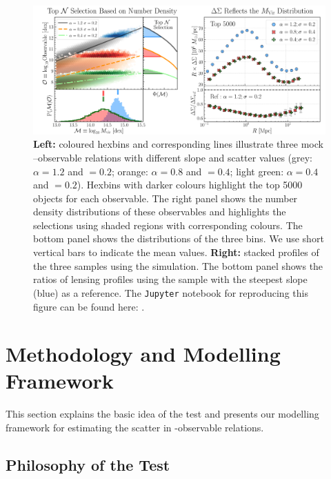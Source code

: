 \documentclass[fleqn,usenatbib,useAMS]{mnras}
\begin{document}
\begin{CJK*}{UTF8}{gbsn}
\begin{figure}
\includegraphics[width=\textwidth]{figure/fig_1}
\caption{
    \textbf{Left:} coloured hexbins and corresponding lines illustrate
        three mock \mvir{}--observable relations with different slope and scatter values
        (grey: $\alpha=1.2$ and \scatterObsSymMhalo{}$=0.2$; 
        orange: $\alpha=0.8$ and \scatterObsSymMhalo{}$=0.4$;
        light green: $\alpha=0.4$ and \scatterObsSymMhalo{}$=0.2$).
        Hexbins with darker colours highlight the top 5000 objects for each observable.
        The right panel shows the number density distributions of these observables
        and highlights the \topn{} selections using shaded regions with corresponding 
        colours.
        The bottom panel shows the \mvir{} distributions of the three \topn{} bins.
        We use short vertical bars to indicate the mean \mvir{} values.
    \textbf{Right:} stacked \rdsigma{} profiles of the three \topn{} samples using the 
         simulation. 
        The bottom panel shows the ratios of lensing profiles using the sample with the steepest
        slope (blue) as a reference.
    The \texttt{Jupyter} notebook for reproducing this figure can be found here:
    \href{https://github.com/dr-guangtou/jianbing/blob/master/notebooks/figure/fig1.ipynb}{\faGithub}.
    }
    \label{fig:theory_1}
\end{figure}
    

\section{Methodology and Modelling Framework}
    \label{sec:method}

    This section explains the basic idea of the \topn{} test and presents our modelling framework 
    for estimating the scatter in \mvir{}-observable relations.
    
\subsection{Philosophy of the \texorpdfstring{\topn{}}{TopN} Test}
    \label{sec:topn_intro}
    

\end{CJK*}
\end{document}
